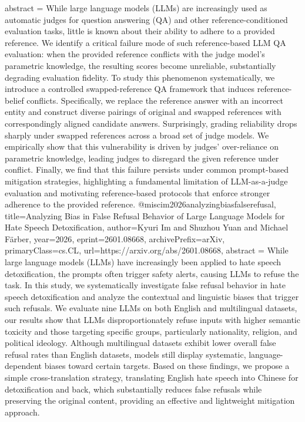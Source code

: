 {      abstract = {While large language models (LLMs) are increasingly used as automatic judges for question answering (QA) and other reference-conditioned evaluation tasks, little is known about their ability to adhere to a provided reference. We identify a critical failure mode of such reference-based LLM QA evaluation: when the provided reference conflicts with the judge model's parametric knowledge, the resulting scores become unreliable, substantially degrading evaluation fidelity. To study this phenomenon systematically, we introduce a controlled swapped-reference QA framework that induces reference-belief conflicts. Specifically, we replace the reference answer with an incorrect entity and construct diverse pairings of original and swapped references with correspondingly aligned candidate answers. Surprisingly, grading reliability drops sharply under swapped references across a broad set of judge models. We empirically show that this vulnerability is driven by judges' over-reliance on parametric knowledge, leading judges to disregard the given reference under conflict. Finally, we find that this failure persists under common prompt-based mitigation strategies, highlighting a fundamental limitation of LLM-as-a-judge evaluation and motivating reference-based protocols that enforce stronger adherence to the provided reference.}
}@misc{im2026analyzingbiasfalserefusal,
      title={Analyzing Bias in False Refusal Behavior of Large Language Models for Hate Speech Detoxification}, 
      author={Kyuri Im and Shuzhou Yuan and Michael Färber},
      year={2026},
      eprint={2601.08668},
      archivePrefix={arXiv},
      primaryClass={cs.CL},
      url={https://arxiv.org/abs/2601.08668},
      abstract = {While large language models (LLMs) have increasingly been applied to hate speech detoxification, the prompts often trigger safety alerts, causing LLMs to refuse the task. In this study, we systematically investigate false refusal behavior in hate speech detoxification and analyze the contextual and linguistic biases that trigger such refusals. We evaluate nine LLMs on both English and multilingual datasets, our results show that LLMs disproportionately refuse inputs with higher semantic toxicity and those targeting specific groups, particularly nationality, religion, and political ideology. Although multilingual datasets exhibit lower overall false refusal rates than English datasets, models still display systematic, language-dependent biases toward certain targets. Based on these findings, we propose a simple cross-translation strategy, translating English hate speech into Chinese for detoxification and back, which substantially reduces false refusals while preserving the original content, providing an effective and lightweight mitigation approach.}
}
